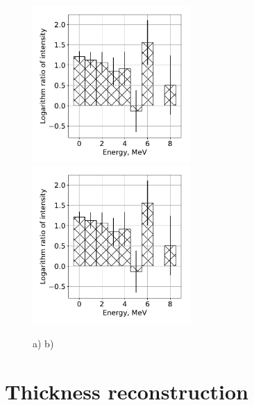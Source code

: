\documentclass[a4paper]{panl}
\begin{document}
\begin{figure}[t]
    \begin{center}
        \includegraphics[width=60mm]{figures/Difference.pdf} 
        \includegraphics[width=60mm]{figures/Difference.pdf}  
        \vspace{-3mm}
        \caption{a) b)}
    \end{center}
    \vspace{-5mm}
\end{figure}


\section*{Thickness reconstruction}
\end{document}
